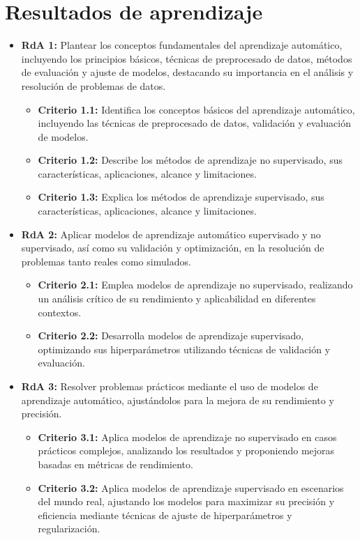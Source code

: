 \documentclass[a4,11pt]{aleph-notas}
\begin{document}
\addtolength{\headheight}{1.8\baselineskip}
\addtolength{\voffset}{-1.5\baselineskip}

\encabezado

\section{Resultados de aprendizaje} 

\begin{itemize}[leftmargin=*]
\item 
    \textbf{RdA 1:} Plantear los conceptos fundamentales del aprendizaje automático, incluyendo los principios básicos, técnicas de preprocesado de datos, métodos de evaluación y ajuste de modelos, destacando su importancia en el análisis y resolución de problemas de datos.
    \begin{itemize}[leftmargin=*]
        \item \textbf{Criterio 1.1:} Identifica los conceptos básicos del aprendizaje automático, incluyendo las técnicas de preprocesado de datos, validación y evaluación de modelos.
        \item \textbf{Criterio 1.2:} Describe los métodos de aprendizaje no supervisado, sus características, aplicaciones, alcance y limitaciones.
        \item \textbf{Criterio 1.3:} Explica los métodos de aprendizaje supervisado, sus características, aplicaciones, alcance y limitaciones.
    \end{itemize}
\item 
    \textbf{RdA 2:} Aplicar modelos de aprendizaje automático supervisado y no supervisado, así como su validación y optimización, en la resolución de problemas tanto reales como simulados.
    \begin{itemize}[leftmargin=*]
        \item \textbf{Criterio 2.1:} Emplea modelos de aprendizaje no supervisado, realizando un análisis crítico de su rendimiento y aplicabilidad en diferentes contextos.
        \item \textbf{Criterio 2.2:} Desarrolla modelos de aprendizaje supervisado, optimizando sus hiperparámetros utilizando técnicas de validación y evaluación.
    \end{itemize}
\item
    \textbf{RdA 3:} Resolver problemas prácticos mediante el uso de modelos de aprendizaje automático, ajustándolos para la mejora de su rendimiento y precisión.
    \begin{itemize}[leftmargin=*]
        \item \textbf{Criterio 3.1:} Aplica modelos de aprendizaje no supervisado en casos prácticos complejos, analizando los resultados y proponiendo mejoras basadas en métricas de rendimiento.
        \item \textbf{Criterio 3.2:} Aplica modelos de aprendizaje supervisado en escenarios del mundo real, ajustando los modelos para maximizar su precisión y eficiencia mediante técnicas de ajuste de hiperparámetros y regularización.
    \end{itemize}
\end{itemize}
\end{document}
